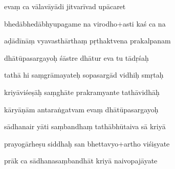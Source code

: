 \documentclass[article,12pt,a4paper]{memoir}%
\newcounter{parCount}
\begin{document}
	  
	  \pstart {} evaṃ ca vālavāyādi jitvarīvad upācaret 
	{}
	\pend%
      

	  
	  \pstart \leavevmode%
	bhedābhedābhyupagame na virodho+asti kaś ca na 
	{}
	\pend%
      

	  
	  \pstart {} aḍādīnāṃ vyavasthārthaṃ pṛthaktvena prakalpanam 
	{}
	\pend%
      

	  
	  \pstart \leavevmode%
	dhātūpasargayoḥ śāstre dhātur eva tu tādṛśaḥ 
	{}
	\pend%
      

	  
	  \pstart {} tathā hi saṃgrāmayateḥ sopasargād vidhiḥ smṛtaḥ 
	{}
	\pend%
      

	  
	  \pstart \leavevmode%
	kriyāviśeṣāḥ saṃghāte prakramyante tathāvidhāḥ 
	{}
	\pend%
      

	  
	  \pstart {} kāryāṇām antaraṅgatvam evaṃ dhātūpasargayoḥ 
	{}
	\pend%
      

	  
	  \pstart \leavevmode%
	sādhanair yāti saṃbandhaṃ tathābhūtaiva sā kriyā 
	{}
	\pend%
      

	  
	  \pstart {} prayogārheṣu siddhaḥ san bhettavyo+artho viśiṣyate 
	{}
	\pend%
      

	  
	  \pstart \leavevmode%
	prāk ca sādhanasaṃbandhāt kriyā naivopajāyate 
	{}
	\pend%
      
\end{document}
